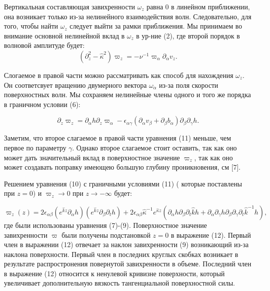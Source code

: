 Вертикальная составляющая завихренности $\omega_z$ равна 0 в линейном приближении, она возникает только из-за нелинейного взаимодействия волн. Следовательно, для того, чтобы найти $\omega_z$ следует выйти за рамки приближения. Мы принимаем во внимание основной нелинейной вклад в $\omega_z$ в ур-ние (2), где второй порядок в волновой амплитуде будет:
\begin{equation}
(\partial_z^2 - \hat{\kappa}^2)\varpi_z = -\nu^{-1} \varpi_\alpha \partial_\alpha	v_z.
\end{equation}

Слогаемое в правой части можно рассматривать как способ для нахождения $\omega_z$. Он соответсвует вращению двумерного вектора $\omega_\alpha$ из-за поля скорости поверхностных волн. Мы сохраняем нелинейные члены одного и того же порядка в граничном условии (6):

\begin{equation}
\partial_z \varpi_z = \partial_\alpha h \partial_z \varpi_\alpha - \epsilon_{\alpha \gamma}(\partial_\alpha v_\beta + \partial_\beta b_\alpha) \partial_\beta \partial_\gamma h.
\end{equation}

Заметим, что второе слагаемое в правой части уравнения (11) меньше, чем первое по параметру $\gamma$. Однако второе слагаемое стоит оставить, так как оно может дать значительный вклад в поверхностное значение $\varpi_z$, так как оно может создавать поправку имеющею большую глубину проникновения, см [7].

Решением уравнения (10) с граничными условиями (11) ( которые поставлены при $z = 0$) и $\varpi_z \to 0$ при $z \to -\infty$ будет:

\begin{equation}
\varpi_z(z) = 2 \epsilon_{\alpha \beta}(e^{\hat{k}z}\partial_\alpha h) (e^{\hat{k}z}\partial_\beta \partial_t h) + 2 \epsilon_{\alpha \beta} \hat{\kappa}^{-1}e^{\hat{\kappa}z}(\partial_\alpha h \partial_\beta \partial_t \hat{k}h + \partial_\alpha \partial_\gamma h \partial_\beta \partial_\gamma \partial_t \hat{k}^{-1} h),
\end{equation}
где были использованы уравнения (7)-(9). Поверхностное значение завихренности $\varpi$ были получены подстановкой $z=0$ в выражение (12). Первый член в выражении (12) отвечает за наклон завихренности (9) возникающий из-за наклона поверхности. Первый член в последних круглых скобках возникает в результате распростронения повернутой завихренности в объеме. Последний член в выражение (12) относится к ненулевой кривизне поверхности, который увеличивает дополнительную вязкость тангенциальной поверхностной силы.

